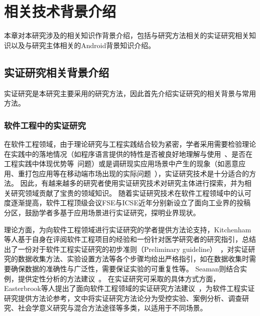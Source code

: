 \chapter{相关技术背景介绍}
\label{chp:background}
%

本章对本研究涉及的相关知识作背景介绍，包括与研究方法相关的实证研究相关知识以及与研究主体相关的Android背景知识介绍。

\section{实证研究相关背景介绍}
实证研究是本研究主要采用的研究方法，因此首先介绍实证研究的相关背景与常用方法。

\subsection{软件工程中的实证研究}
在软件工程领域，由于理论研究与工程实践结合较为紧密，学者采用需要检验理论在实践中的落地情况（如程序语言提供的特性是否被良好地理解与使用~\cite{bieman1995reuse}、是否在工程实践中体现优势等~\cite{harrison2000experimental}问题）或是调研现实应用场景中产生的现象（如恶意应用、重打包应用等在移动端市场出现的实际问题~\cite{Felt2011ASO, Zhou2012DissectingAM, Andow2016ASO, wang2018android}），实证研究技术是十分适合的方法。
因此，有越来越多的研究者使用实证研究技术对研究主体进行探索\cite{Felt2011ASO, Zhou2012DissectingAM, Andow2016ASO, wang2018android, chen2018ausera, chen2018mobile, bieman1995reuse, harrison2000experimental, dybaa2008empirical, manotas2016empirical, mcintosh2016empirical, mcilroy2016fresh, wu2016ji, yang2015xin, hu2019dating, khanmohammadi2019empirical}，并为相关研究领域贡献了宝贵的领域知识。
随着实证研究技术在软件工程领域中的认可度逐渐提高，软件工程顶级会议FSE与ICSE近年分别新设立了面向工业界的投稿分区，鼓励学者多基于应用场景进行实证研究，探明业界现状。

理论方面，为向软件工程领域进行实证研究的学者提供方法论支持，Kitchenham等人基于自身在评阅软件工程项目的经验和一份针对医学研究者的研究指引，总结出了一份对于软件工程实证研究的初步准则（Preliminary guideline）~\cite{kitchenham2002preliminary}，对实证研究的数据收集方法、实验设置方法等各个步骤均给出严格指引，如在数据收集时需要确保数据的准确性与广泛性，需要保证实验的可重复性等。
Seaman则结合实例，提供定性分析的方法建议~\cite{seaman1999qualitative}。
在实证研究可采取的具体方式方面，Easterbrook等人提出了面向软件工程领域的实证研究方法建议~\cite{easterbrook2008selecting}，为软件工程实证研究提供方法论参考，文中将实证研究方法论分为受控实验、案例分析、调查研究、社会学意义研究与混合方法途径等多类，以适用于不同场景。

